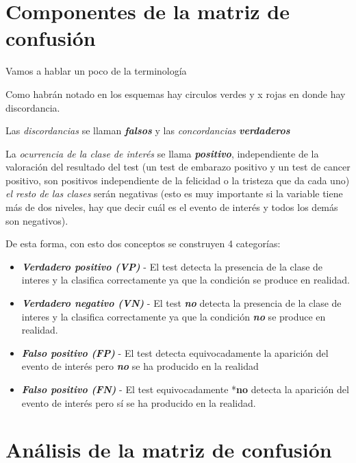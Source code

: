 \documentclass[
]{book}
\begin{document}
\hypertarget{componentes-de-la-matriz-de-confusiuxf3n}{%
\section{Componentes de la matriz de confusión}\label{componentes-de-la-matriz-de-confusiuxf3n}}

Vamos a hablar un poco de la terminología

Como habrán notado en los esquemas hay circulos verdes y x rojas en donde hay discordancia.

Las \emph{discordancias} se llaman \textbf{\emph{falsos}} y las \emph{concordancias} \textbf{\emph{verdaderos}}

La \emph{ocurrencia de la clase de interés} se llama \textbf{\emph{positivo}}, independiente de la valoración del resultado del test (un test de embarazo positivo y un test de cancer positivo, son positivos independiente de la felicidad o la tristeza que da cada uno) \emph{el resto de las clases} serán negativas (esto es muy importante si la variable tiene más de dos niveles, hay que decir cuál es el evento de interés y todos los demás son negativos).

De esta forma, con esto dos conceptos se construyen 4 categorías:

\begin{itemize}
\item
  \textbf{\emph{Verdadero positivo (VP)}} - El test detecta la presencia de la clase de interes y la clasifica correctamente ya que la condición se produce en realidad.
\item
  \textbf{\emph{Verdadero negativo (VN)}} - El test \textbf{\emph{no}} detecta la presencia de la clase de interes y la clasifica correctamente ya que la condición \textbf{\emph{no}} se produce en realidad.
\item
  \textbf{\emph{Falso positivo (FP)}} - El test detecta equivocadamente la aparición del evento de interés pero \textbf{\emph{no}} se ha producido en la realidad
\item
  \textbf{\emph{Falso positivo (FN)}} - El test equivocadamente *\textbf{no} detecta la aparición del evento de interés pero sí se ha producido en la realidad.
\end{itemize}

\hypertarget{anuxe1lisis-de-la-matriz-de-confusiuxf3n}{%
\section{Análisis de la matriz de confusión}\label{anuxe1lisis-de-la-matriz-de-confusiuxf3n}}
\end{document}
